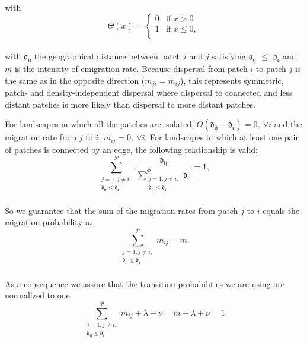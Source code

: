 \documentclass[a4paper,12pt]{article}
\begin{document}
with\\
\begin{equation*}
\Theta (x)= 
\begin{cases}
    0 & \text{if } x > 0\\
    1 & \text{if } x \le 0,\\
\end{cases}
\end{equation*}
\\

with $\mathfrak{d_{ij}}$ the geographical distance between patch $i$ and $j$ satisfying $\mathfrak{d_{ij}}$ $\leq$ $\mathfrak{d_{c}}$ and $m$ is the intensity of emigration rate. Because dispersal from patch $i$ to patch $j$ is the same as in the opposite direction ($m_{ji} = m_{ij}$), this represents symmetric, patch- and density-independent dispersal where dispersal to connected and less distant patches is more likely than dispersal to more distant patches. 

For landscapes in which all the patches are isolated, $\Theta (\mathfrak{d_{ij}} - \mathfrak{d_{c}}) = 0, \ \forall i$ and the migration rate from $j$ to $i$, $m_{ij} = 0, \ \forall i$. For landscapes in which at least one pair of patches is connected by an edge, the following relationship is valid:\\

\begin{equation*}
\sum\limits^{\mathcal{P}}_{\substack{j = 1,j \ne i,\\ \mathfrak{d_{ij}} \leq \mathfrak{d_{c}}}}{\frac{\mathfrak{d_{ij}}}{\sum\limits^{\mathcal{P}}_{\substack{j = 1,j \ne i,\\ \mathfrak{d_{ij}} \leq \mathfrak{d_{c}}}}\mathfrak{d_{ij}}}} = 1,
\end{equation*}
\\

So we guarantee that the sum of the migration rates from patch $j$ to $i$ equals the migration probability $m$
\begin{equation*}
\sum\limits^{\mathcal{P}}_{\substack{j = 1,j \ne i,\\ \mathfrak{d_{ij}} \leq \mathfrak{d_{c}}}}{m_{ij}} = m.
\end{equation*}
\\

As a consequence we assure that the transition probabilities we are using are normalized to one\\
\begin{equation*}
\sum\limits^{\mathcal{P}}_{\substack{j = 1,j \ne i,\\ \mathfrak{d_{ij}} \leq \mathfrak{d_{c}}}}{m_{ij}} + \lambda + \nu = m + \lambda + \nu = 1
\end{equation*}
\\
\end{document}

